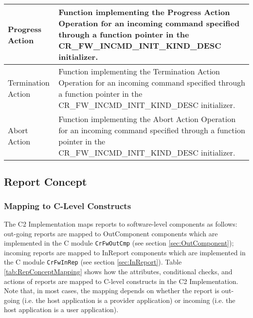 \documentclass{pnp_article}
\begin{document}
\begin{longtable}{|>{\raggedright}p{2.0cm}|p{11.3cm}|}
\hline
Progress Action & Function implementing the Progress Action Operation for an incoming command specified through a function pointer in the CR\_FW\_INCMD\_INIT\_KIND\_DESC initializer. \\
\hline
Termination Action & Function implementing the Termination Action Operation for an incoming command specified through a function pointer in the CR\_FW\_INCMD\_INIT\_KIND\_DESC initializer. \\
\hline
Abort Action & Function implementing the Abort Action Operation for an incoming command specified through a function pointer in the CR\_FW\_INCMD\_INIT\_KIND\_DESC initializer. \\
\hline
\end{longtable}


\subsection{Report Concept }\label{sec:RepConcept}


\subsubsection{Mapping to C-Level Constructs}\label{sec:RepConceptMapping}
The C2 Implementation maps reports to software-level components as follows: out-going reports are mapped to OutComponent components which are implemented in the C module \texttt{CrFwOutCmp} (see section \ref{sec:OutComponent}); incoming reports are mapped to InReport components which are implemented in the C module \texttt{CrFwInRep} (see section \ref{sec:InReport}). Table \ref{tab:RepConceptMapping} shows how the attributes, conditional checks, and actions of reports are mapped to C-level constructs in the C2 Implementation. Note that, in most cases, the mapping depends on whether the report is out-going (i.e. the host application is a provider application) or incoming (i.e. the host application is a user application).
\end{document}
